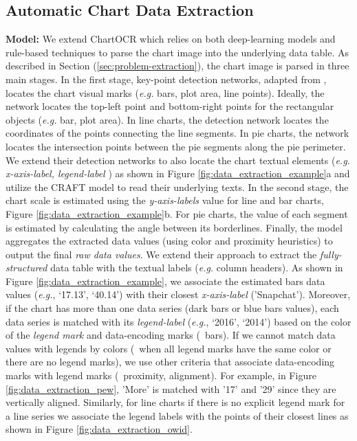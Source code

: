 \subsection{Automatic Chart Data Extraction}
\label{app:data_extraction}
\textbf{Model:} We extend ChartOCR \cite{ChartOCR} which relies on both deep-learning models and rule-based techniques to parse the chart image into the underlying data table. As described in Section (\cref{sec:problem-extraction}), the chart image is parsed in three main stages. In the first stage, key-point detection networks, adapted from \cite{Law2019CornerNetDO}, locates the chart visual marks (\textit{e.g.} bars, plot area, line points). Ideally, the network locates the top-left point and bottom-right points for the rectangular objects (\textit{e.g.} bar, plot area). In line charts, the detection network locates the coordinates of the points connecting the line segments. In pie charts, the network locates the intersection points between the pie segments along the pie perimeter. We extend their detection networks to also locate the chart textual elements (\textit{e.g. x-axis-label, legend-label} ) as shown in Figure \ref{fig:data_extraction_example}a and utilize the CRAFT model \cite{craftrecognition} to read their underlying texts. In the second stage, the chart scale is estimated using the \textit{y-axis-labels} value for line and bar charts, Figure \ref{fig:data_extraction_example}b. For pie charts, the value of each segment is estimated by calculating the angle between its borderlines. Finally, the model aggregates the extracted data values (using color and proximity heuristics) to output the final \textit{raw data values}. We extend their approach to extract the \textit{fully-structured} data table with the textual labels (\textit{e.g.} column headers). As shown in Figure \ref{fig:data_extraction_example}, we associate the estimated bars data values (\textit{e.g.}, `17.13', `40.14') with their closest \textit{x-axis-label} ('Snapchat'). Moreover, if the chart has more than one data series (dark bars or blue bars values), each data series is matched with its \textit{legend-label} (\textit{e.g.}, `2016', `2014') based on the color of the \textit{legend mark} and data-encoding marks (\eg\ bars). 
If we cannot match data values with legends by colors (\eg\ when all legend marks have the same color or there are no legend marks), we use other criteria that associate data-encoding marks with legend marks (\eg\ proximity, alignment). For example, in Figure \ref{fig:data_extraction_pew}, 'More' is matched with '17' and '29' since they are vertically aligned. Similarly, for line charts if there is no explicit legend mark for a line series 
we associate the legend labels with the points of their closest lines as shown in Figure \ref{fig:data_extraction_owid}.



